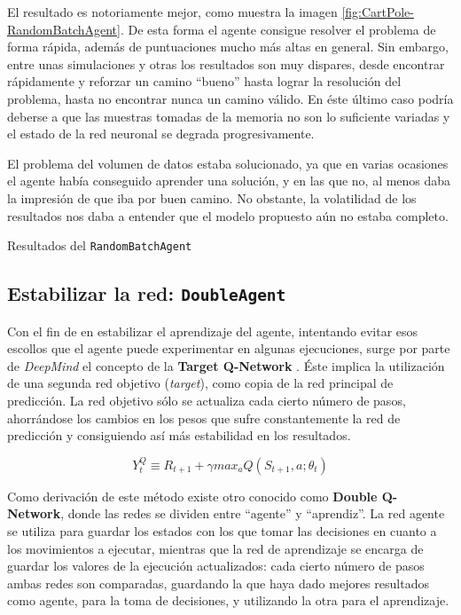 El resultado es notoriamente mejor, como muestra la imagen \ref{fig:CartPole-RandomBatchAgent}. De esta forma el agente consigue resolver el problema de forma rápida, además de puntuaciones mucho más altas en general. Sin embargo, entre unas simulaciones y otras los resultados son muy dispares, desde encontrar rápidamente y reforzar un camino ``bueno'' hasta lograr la resolución del problema, hasta no encontrar nunca un camino válido. En éste último caso podría deberse a que las muestras tomadas de la memoria no son lo suficiente variadas y el estado de la red neuronal se degrada progresivamente.

El problema del volumen de datos estaba solucionado, ya que en varias ocasiones el agente había conseguido aprender una solución, y en las que no, al menos daba la impresión de que iba por buen camino. No obstante, la volatilidad de los resultados nos daba a entender que el modelo propuesto aún no estaba completo.

%
       {Resultados del \texttt{RandomBatchAgent}}


\subsection{Estabilizar la red: \texttt{DoubleAgent}}
\label{sec:DA}

Con el fin de en estabilizar el aprendizaje del agente, intentando evitar esos escollos que el agente puede experimentar en algunas ejecuciones, surge por parte de \textit{DeepMind} el concepto de la \textbf{Target Q-Network} \citep{NIPS2010_3964}. Éste implica la utilización de una segunda red objetivo (\textit{target}), como copia de la red principal de predicción. La red objetivo sólo se actualiza cada cierto número de pasos, ahorrándose los cambios en los pesos que sufre constantemente la red de predicción y consiguiendo así más estabilidad en los resultados.

$$Y^Q_{t} \equiv R_{t+1} + \gamma max_{a} Q(S_{t+1}, a; \theta_{t})$$

Como derivación de este método existe otro conocido como \textbf{Double Q-Network}, donde las redes se dividen entre ``agente'' y ``aprendiz''. La red agente se utiliza para guardar los estados con los que tomar las decisiones en cuanto a los movimientos a ejecutar, mientras que la red de aprendizaje se encarga de guardar los valores de la ejecución actualizados: cada cierto número de pasos ambas redes son comparadas, guardando la que haya dado mejores resultados como agente, para la toma de decisiones, y utilizando la otra para el aprendizaje.

